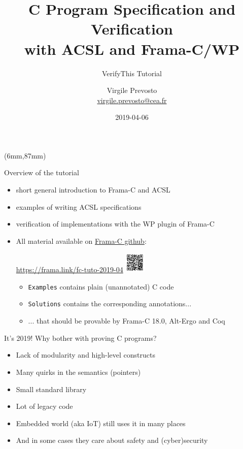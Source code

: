 \documentclass[pdf,xcolor={svgnames}]{beamer}
\author{Virgile Prevosto\\
\href{mailto:virgile.prevosto@cea.fr}{virgile.prevosto@cea.fr}}
\institute{CEA Tech List}
\title{C Program Specification and Verification\\ with ACSL and Frama-C/WP}
\subtitle{VerifyThis Tutorial}
\date{2019-04-06}
\def\good{\textcolor{darkgreen}{\ding{52}}}
\def\bad{\textcolor{red}{\ding{56}}}
\begin{document}
\begin{frame}\maketitle
\begin{textblock*}{1.5cm}(6mm,87mm)
\doclicenseImage[imagewidth=8mm]
\end{textblock*}
\end{frame}

\begin{frame}{Overview of the tutorial}
\begin{itemize}
\item short general introduction to Frama-C and ACSL
\item examples of writing ACSL specifications
\item verification of implementations with the WP plugin of Frama-C
\item All material available on \href{https://github.com/Frama-C/open-source-case-studies/tree/master/tutorials/2019-04-VerifyThis}{Frama-C github}:
\begin{center}
\url{https://frama.link/fc-tuto-2019-04}\hspace{5mm}
\includegraphics[width=1cm,align=c]{tuto-qr.pdf}
\end{center}
\begin{itemize}
\item \alert{\texttt{Examples}} contains plain (unannotated) C code
\item \alert{\texttt{Solutions}} contains the corresponding annotations...
\item ... that should be provable by Frama-C 18.0, Alt-Ergo and Coq
\end{itemize}
\end{itemize}
\end{frame}

\begin{frame}{It's 2019! Why bother with proving C programs?}
\begin{itemize}
\item[\bad] Lack of modularity and high-level constructs
\item[\bad] Many quirks in the semantics (pointers)
\item[\bad] Small standard library
\item[\good] Lot of legacy code
\item[\good] Embedded world (aka IoT) still uses it in many places
\item[\good] And in some cases they care about safety and (cyber)security
\end{itemize}
\end{frame}
\end{document}
